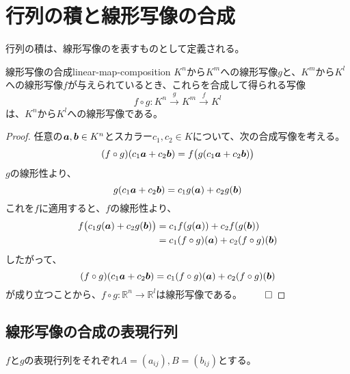 \documentclass[../../../topic_linear-algebra]{subfiles}
\begin{document}
\sectionline
\section{行列の積と線形写像の合成}

行列の積は、線形写像のを表すものとして定義される。

\begin{theorem}{線形写像の合成}{linear-map-composition}
  $K^n$から$K^m$への線形写像$g$と、$K^m$から$K^l$への線形写像$f$が与えられているとき、これらを合成して得られる写像
  \begin{equation*}
    f \circ g\colon K^n \xrightarrow{g} K^m \xrightarrow{f} K^l
  \end{equation*}
  は、$K^n$から$K^l$への線形写像である。
\end{theorem}

\begin{proof}
  任意の$\vb*{a},\vb*{b} \in K^n$とスカラー$c_1,c_2 \in K$について、次の合成写像を考える。
  \begin{equation*}
    (f \circ g)(c_1\vb*{a}+c_2\vb*{b}) = f\bigl(g(c_1\vb*{a}+c_2\vb*{b})\bigr)
  \end{equation*}
  $g$の線形性より、
  \begin{equation*}
    g(c_1\vb*{a}+c_2\vb*{b}) = c_1 g(\vb*{a}) + c_2 g(\vb*{b})
  \end{equation*}
  これを$f$に適用すると、$f$の線形性より、
  \begin{align*}
    f\bigl(c_1 g(\vb*{a}) + c_2 g(\vb*{b})\bigr) &= c_1 f(g(\vb*{a})) + c_2 f(g(\vb*{b})) \\
    &= c_1(f \circ g)(\vb*{a}) + c_2(f \circ g)(\vb*{b})
  \end{align*}
  したがって、
  \begin{equation*}
    (f \circ g)(c_1\vb*{a}+c_2\vb*{b}) = c_1(f \circ g)(\vb*{a}) + c_2(f \circ g)(\vb*{b})
  \end{equation*}
  が成り立つことから、$f \circ g \colon \mathbb{R}^n \to \mathbb{R}^l$は線形写像である。 $\qed$
\end{proof}

\subsection{線形写像の合成の表現行列}

$f$と$g$の表現行列をそれぞれ$A = (a_{ij}), B = (b_{ij})$とする。
\end{document}
